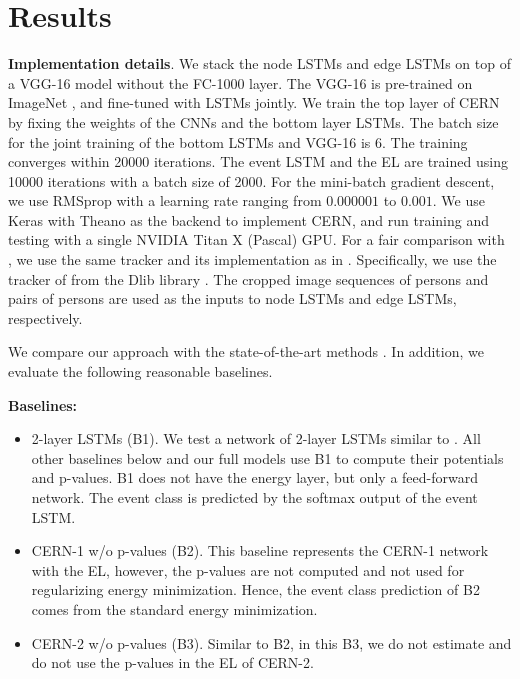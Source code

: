 \documentclass[10pt,twocolumn,letterpaper]{article}
\begin{document}
\section{Results}\label{sec:results}

{\bf Implementation details}. We stack the node LSTMs and edge LSTMs on top of a VGG-16 model \cite{Simonyan2014} without the FC-1000 layer. The VGG-16 is pre-trained on ImageNet \cite{Deng2009}, and fine-tuned with LSTMs jointly. We train the top layer of CERN by fixing the weights of the CNNs and the bottom layer LSTMs. The batch size for the joint training of the bottom LSTMs and VGG-16 is 6. The training converges within 20000 iterations. The event LSTM and the EL are trained using 10000 iterations with a batch size of 2000. For the mini-batch gradient descent, we use RMSprop \cite{Tieleman2012} with a learning rate ranging from $0.000001$ to $0.001$.  We use Keras \cite{chollet2015keras} with Theano \cite{Theano2016} as the backend to implement CERN, and run training and testing with a single NVIDIA Titan X (Pascal) GPU. For a fair comparison with \cite{Ibrahim2016}, we use the same tracker and its implementation as in \cite{Ibrahim2016}. Specifically, we use the tracker of \cite{Danelljan2014} from the Dlib library \cite{King2009}. The cropped image sequences of persons and pairs of persons are used as the inputs to node LSTMs and edge LSTMs, respectively.

We compare our approach with the state-of-the-art methods \cite{Hajimirsadeghi2015, Ibrahim2016}. In addition, we evaluate the following reasonable baselines.

{\bf Baselines:}
\begin{itemize}[itemsep=-5pt,topsep=2pt, partopsep=1pt]
\item 2-layer LSTMs (B1).  We test a network of 2-layer LSTMs similar to \cite{Ibrahim2016}. All other baselines below and our full models use B1 to compute their potentials and p-values. B1 does not have the energy layer, but only a feed-forward network. The event class is predicted by the softmax output of the event LSTM.
\item CERN-1 w/o p-values (B2). This baseline represents the CERN-1 network with the EL, however, the p-values are not computed and not used for regularizing energy minimization. Hence, the event class prediction of B2 comes from the standard energy minimization.
\item CERN-2 w/o p-values (B3). Similar to B2, in this B3, we do not estimate and do not use the p-values in the EL of CERN-2.
\end{itemize}
\end{document}
